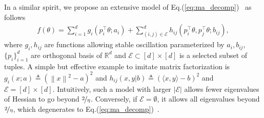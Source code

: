 \documentclass{article}
\newcommand{\citep}[1]{\cite{#1}}
\theoremstyle{plain}
\theoremstyle{remark}
\newcommand{\norm}[1]{\left\lVert#1\right\rVert}
\def\R{\mathbb{R}}
\newcommand{\lei}[1]{\noindent{\color{red}{[Lei: #1]}}}
\begin{document}
In a similar spirit, we propose an extensive model of Eq.(\ref{eq:ma_decomp})~\citep{ma2022multiscale} as follows
\begin{align}
    \label{eq:new_decomp}
    f(\theta)=\sum_{i=1}^d g_i(p_i^\top \theta;a_i)  + \sum_{(i,j)\in\mathcal{E}}^d h_{ij}(p_i^\top \theta, p_j^\top \theta; b_{ij}),
\end{align}
where $g_i, h_{ij}$ are functions allowing stable oscillation parameterized by $a_i, b_{ij}$, $\{p_i\}_{i=1}^d$ are orthogonal basis of $\R^d$ and $\mathcal{E}\subset [d]\times[d]$ is a selected subset of tuples. A simple but effective example to imitate matrix factorization is $g_i(x;a)\triangleq (\norm{x}^2-a)^2$ and $h_{ij}(x,y|b)\triangleq (\langle x,y\rangle - b)^2$ and $\mathcal{E}=[d]\times[d]$. Intuitively, such a model with larger $|\mathcal{E}|$ allows fewer eigenvalues of Hessian to go beyond $\nicefrac{2}{\eta}$. Conversely, if $\mathcal{E}=\emptyset$, it allows all eigenvalues beyond $\nicefrac{2}{\eta}$, which degenerates to Eq.(\ref{eq:ma_decomp})~\citep{ma2022multiscale}.




\end{document}
